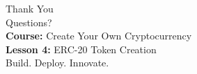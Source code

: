 \documentclass[8pt,aspectratio=169]{beamer}
\begin{document}
\begin{frame}[plain]
\vspace{2cm}
\begin{center}
{\Large Thank You}\\[1cm]
{\normalsize Questions?}\\[2cm]
{\small \textbf{Course:} Create Your Own Cryptocurrency}\\[0.3cm]
{\small \textbf{Lesson 4:} ERC-20 Token Creation}\\[1cm]
\textcolor{mlgray}{\small Build. Deploy. Innovate.}
\end{center}
\end{frame}
\end{document}

